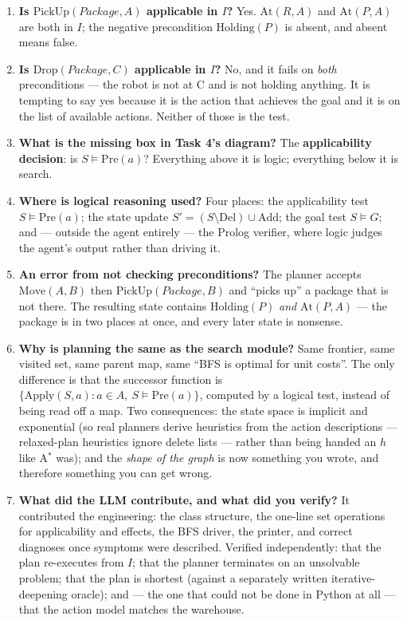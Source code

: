 \documentclass[11pt,a4paper]{article}
\newcommand{\ent}{\models}
\begin{document}
\begin{enumerate}\itemsep6pt

\item \textbf{Is $\mathrm{PickUp}(Package,A)$ applicable in $I$?}
Yes. $\mathrm{At}(R,A)$ and $\mathrm{At}(P,A)$ are both in $I$; the negative
precondition $\mathrm{Holding}(P)$ is absent, and absent means false.

\item \textbf{Is $\mathrm{Drop}(Package,C)$ applicable in $I$?}
No, and it fails on \emph{both} preconditions --- the robot is not at C and is
not holding anything. It is tempting to say yes because it is the action that
achieves the goal and it is on the list of available actions. Neither of those
is the test.

\item \textbf{What is the missing box in Task 4's diagram?}
The \textbf{applicability decision}: is $S \ent \mathrm{Pre}(a)$? Everything
above it is logic; everything below it is search.

\item \textbf{Where is logical reasoning used?}
Four places: the applicability test $S \ent \mathrm{Pre}(a)$; the state update
$S' = (S \setminus \mathrm{Del}) \cup \mathrm{Add}$; the goal test $S \ent G$;
and --- outside the agent entirely --- the Prolog verifier, where logic judges
the agent's output rather than driving it.

\item \textbf{An error from not checking preconditions?}
The planner accepts $\mathrm{Move}(A,B)$ then $\mathrm{PickUp}(Package,B)$ and
``picks up'' a package that is not there. The resulting state contains
$\mathrm{Holding}(P)$ \emph{and} $\mathrm{At}(P,A)$ --- the package is in two
places at once, and every later state is nonsense.

\item \textbf{Why is planning the same as the search module?}
Same frontier, same visited set, same parent map, same ``BFS is optimal for
unit costs''. The only difference is that the successor function is
$\{\mathrm{Apply}(S,a) : a \in A,\ S \ent \mathrm{Pre}(a)\}$, computed by a
logical test, instead of being read off a map. Two consequences: the state space
is implicit and exponential (so real planners derive heuristics from the action
descriptions --- relaxed-plan heuristics ignore delete lists --- rather than
being handed an $h$ like A$^\ast$ was); and the \emph{shape of the graph} is
now something you wrote, and therefore something you can get wrong.

\item \textbf{What did the LLM contribute, and what did you verify?}
It contributed the engineering: the class structure, the one-line set operations
for applicability and effects, the BFS driver, the printer, and correct
diagnoses once symptoms were described. Verified independently: that the plan
re-executes from $I$; that the planner terminates on an unsolvable problem; that
the plan is shortest (against a separately written iterative-deepening oracle);
and --- the one that could not be done in Python at all --- that the action
model matches the warehouse.

\end{enumerate}
\end{document}
